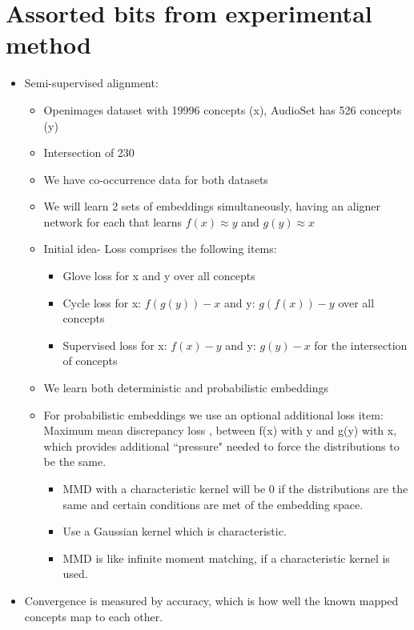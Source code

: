 \section{Assorted bits from experimental method}
\begin{itemize}
    \item Semi-supervised alignment: 
    \begin{itemize}
        \item Openimages dataset with 19996 concepts (x), AudioSet has 526 concepts (y)
        \item Intersection of 230
        \item We have co-occurrence data for both datasets
        \item We will learn 2 sets of embeddings simultaneously, having an aligner network for each
        that learns $f(x) \approx y$ and $g(y) \approx x$
        \item Initial idea- Loss comprises the following items:
        \begin{itemize}
            \item Glove loss for x and y over all concepts
            \item Cycle loss for x: $f(g(y)) - x$ and y: $g(f(x)) - y$ over all concepts
            \item Supervised loss for x: $f(x) - y$ and y: $g(y) - x$ for the intersection of concepts
        \end{itemize}
        \item We learn both deterministic and probabilistic embeddings 
        \item For probabilistic embeddings we use an optional additional loss item: Maximum mean discrepancy loss \cite{MMDGretton}, between f(x) with y and g(y) with x,  which provides additional ``pressure" needed to force the distributions to be the same. 
        \begin{itemize}
            \item MMD with a characteristic kernel will be 0 if the distributions are the same and certain conditions are met of the embedding space. 
            \item Use a Gaussian kernel which is characteristic.
            \item MMD is like infinite moment matching, if a characteristic kernel is used. 
        \end{itemize} 
    \end{itemize}
    \item Convergence is measured by accuracy, which is how well the known mapped concepts map to each other.

\end{itemize}
